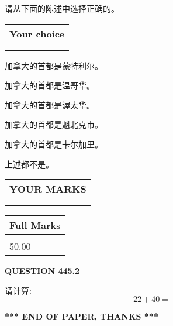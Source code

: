 \documentclass{ctexart}
\begin{document}
  
请从下面的陈述中选择正确的。
  
  
\noindent\hspace{3.0in} \begin{tabular}{|l|}
\hline
Your choice \\
\hline
 \\ 
 \\ 
\hline
\end{tabular}
  
  
 
 
加拿大的首都是蒙特利尔。
 
 
加拿大的首都是温哥华。
 
 
加拿大的首都是渥太华。
 
 
加拿大的首都是魁北克市。
 
 
加拿大的首都是卡尔加里。
 
 
 上述都不是。
 
 
  
\vspace{0.2in}
  
\noindent\begin{tabular}{|l|}
\hline
 YOUR MARKS  \\
\hline
 \\ 
 \\ 
\hline
\end{tabular}
\hspace{0.05in} \begin{tabular}{|l|}
\hline
 Full Marks  \\
\hline
 \\ 
50.00 \\
\hline
\end{tabular}
{\textbf{\Large{QUESTION
445.2 
}}}
  
  
 
请计算:
\begin{equation}
22 +  %
40 = \nonumber
\end{equation}
 

 

 
   
   
 \vspace{0.2in}
 
   
   
   
   
\vspace{1.0in} 
{\textbf{\large{ *** END OF PAPER, THANKS *** }}} 
   
\end{document}
